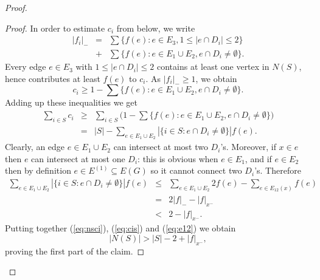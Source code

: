 \documentclass[10pt,a4paper]{amsart}
\begin{document}
\begin{proof}
\begin{proof}
In order to estimate $c_i$ from below, we write
\begin{eqnarray} \label{eq:twosums}
|f_i|_- & = & \sum \{ f(e): e \in E_3, 1 \le |e \cap D_i| \le 2\} \nonumber \\  & + & \sum \{ f(e): e \in E_1 \cup E_2, e \cap D_i \ne \emptyset\}.
\end{eqnarray}
Every edge $e \in E_3$ with $1 \le |e \cap D_i| \le 2$ contains at least one vertex in $N(S)$, hence contributes at least $f(e)$ to $c_i$. As $|f_i|_- \ge 1$, we obtain \[ c_i \ge 1 - \sum \{ f(e): e \in E_1 \cup E_2, e \cap D_i \ne \emptyset \}.\] Adding up these inequalities we get
\begin{eqnarray} \label{eq:cis}
\sum_{i \in S} c_i & \ge & \sum_{i \in S} \bigl( 1 - \sum \{ f(e): e \in E_1 \cup E_2, e \cap D_i \ne \emptyset \} \bigr) \nonumber \\
& = & |S| - \sum_{e \in E_1 \cup E_2} |\{ i \in S: e \cap D_i \ne \emptyset \}| f(e).
\end{eqnarray}
Clearly, an edge $e \in E_1 \cup E_2$ can intersect at most two $D_i$'s. Moreover, if $x \in e$ then $e$ can intersect at most one $D_i$: this is obvious when $e \in E_1$, and if $e \in E_2$ then by definition $e \in E^{(1)} \subseteq E(G)$ so it cannot connect two $D_i$'s. Therefore
\begin{eqnarray} \label{eq:e12}
\sum_{e \in E_1 \cup E_2} |\{ i \in S: e \cap D_i \ne \emptyset \}| f(e) & \le & \sum_{e \in E_1 \cup E_2} 2f(e) - \sum_{e \in E_{12}(x)} f(e) \nonumber \\
& = & 2|f|_- - |f|_{x^-} \nonumber \\
& < & 2 - |f|_{x^-}.
\end{eqnarray}
Putting together (\ref{eq:nsci}), (\ref{eq:cis}) and (\ref{eq:e12}) we obtain \[ |N(S)| > |S| - 2 + |f|_{x^-},\] proving the first part of the claim.


\end{proof}
\end{proof}
\end{document}
